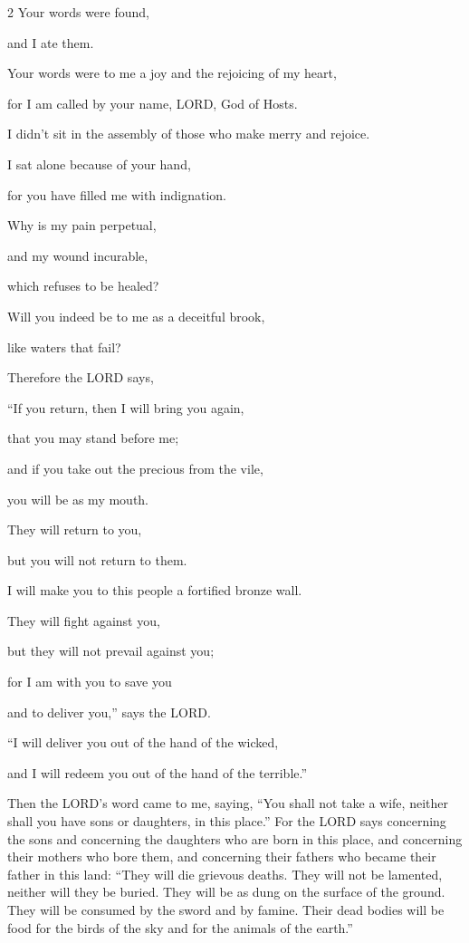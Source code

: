 \begin{multicols}{2}
\myverse{}Your words were found,

and I ate them.

Your words were to me a joy and the rejoicing of my heart,

for I am called by your name, LORD, God of Hosts.


\myverse{}I didn’t sit in the assembly of those who make merry and rejoice.

I sat alone because of your hand,

for you have filled me with indignation.


\myverse{}Why is my pain perpetual,

and my wound incurable,

which refuses to be healed?

Will you indeed be to me as a deceitful brook,

like waters that fail?


\myverse{}Therefore the LORD says,

“If you return, then I will bring you again,

that you may stand before me;

and if you take out the precious from the vile,

you will be as my mouth.

They will return to you,

but you will not return to them.


\myverse{}I will make you to this people a fortified bronze wall.

They will fight against you,

but they will not prevail against you;

for I am with you to save you

and to deliver you,” says the LORD.


\myverse{}“I will deliver you out of the hand of the wicked,

and I will redeem you out of the hand of the terrible.”
\end{multicols}

\mychapter{} \myverse*{}Then the LORD’s word came to me, saying, \myverse{}“You shall not take a wife, neither shall you have sons or daughters, in this place.” \myverse{}For the LORD says concerning the sons and concerning the daughters who are born in this place, and concerning their mothers who bore them, and concerning their fathers who became their father in this land: \myverse{}“They will die grievous deaths. They will not be lamented, neither will they be buried. They will be as dung on the surface of the ground. They will be consumed by the sword and by famine. Their dead bodies will be food for the birds of the sky and for the animals of the earth.”


